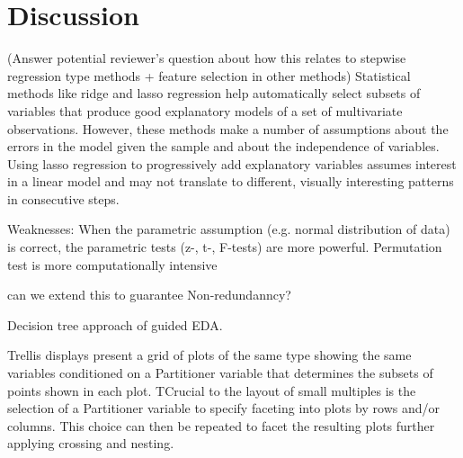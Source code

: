 \section{Discussion}
\label{sec:discussion}
(Answer potential reviewer's question about how this relates to stepwise regression type methods + feature selection in other methods)
Statistical methods like ridge and lasso regression help automatically select subsets of variables that produce good explanatory models of a set of multivariate observations. However, these methods make a number of assumptions about the errors in the model given the sample and about the independence of  variables. Using lasso regression to progressively add explanatory variables assumes interest in a linear model and may not translate to different, visually interesting  patterns in consecutive steps.

Weaknesses:
When the parametric assumption (e.g. normal distribution of data) is correct, the parametric tests (z-, t-, F-tests) are more powerful.
Permutation test is more computationally intensive

can we extend this to guarantee Non-redundanncy?

Decision tree approach of guided EDA.

Trellis displays present a grid of plots of the same type showing the same variables conditioned on a Partitioner variable that determines the subsets of points shown in each plot. TCrucial to the layout of small multiples is the selection of a Partitioner variable to specify faceting into plots by rows and/or columns. This choice can then be repeated to facet the resulting plots further applying crossing and nesting.


